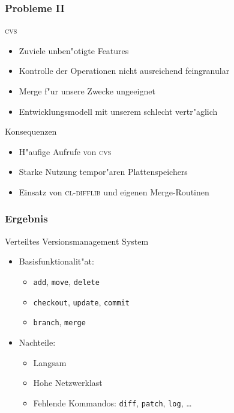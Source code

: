 \documentclass[german, presentation]{beamer}
\begin{document}
\begin{frame} \frametitle{Probleme II}
  \begin{block}{\textsc{cvs}}
    \begin{itemize}
    \item Zuviele unben"otigte Features
    \item Kontrolle der Operationen nicht ausreichend feingranular
    \item Merge f"ur unsere Zwecke ungeeignet
    \item Entwicklungsmodell mit unserem schlecht vertr"aglich
    \end{itemize}
  \end{block}
  \begin{block}{Konsequenzen}
    \begin{itemize}
    \item H"aufige Aufrufe von \textsc{cvs}
    \item Starke Nutzung tempor"aren Plattenspeichers
    \item Einsatz von \textsc{cl-difflib} und eigenen Merge-Routinen
    \end{itemize}
  \end{block}
\end{frame}


\begin{frame} \frametitle{Ergebnis}
  \begin{block}{Verteiltes Versionsmanagement System}
    \begin{itemize}
    \item Basisfunktionalit"at:
      \begin{itemize}
      \item \texttt{add}, \texttt{move}, \texttt{delete}
      \item \texttt{checkout}, \texttt{update}, \texttt{commit}
      \item \texttt{branch}, \texttt{merge}
      \end{itemize}
    \item Nachteile:
      \begin{itemize}
      \item Langsam
      \item Hohe Netzwerklast
      \item Fehlende Kommandos: \texttt{diff}, \texttt{patch},
        \texttt{log}, \ldots
      \end{itemize}
    \end{itemize}
  \end{block}
\end{frame}
\end{document}
